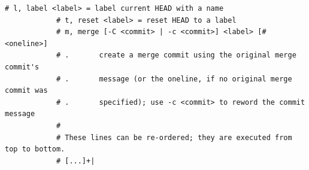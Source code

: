 \documentclass[usenames,svgnames,14pt]{beamer}
\begin{document}
\begin{frame}[c,fragile]
\begin{onlyenv}
\begin{lstlisting}[style=MyBash, basicstyle=\ttfamily\tiny\color{basic-color}, aboveskip=-4pt]
            # l, label <label> = label current HEAD with a name
            # t, reset <label> = reset HEAD to a label
            # m, merge [-C <commit> | -c <commit>] <label> [# <oneline>]
            # .       create a merge commit using the original merge commit's
            # .       message (or the oneline, if no original merge commit was
            # .       specified); use -c <commit> to reword the commit message
            #
            # These lines can be re-ordered; they are executed from top to bottom.
            # [...]+|
        \end{lstlisting}
    \end{onlyenv}
    \PrepareURLsymbol[PB]
\end{frame}
\newsavebox{\savedTikZ}
\end{document}
